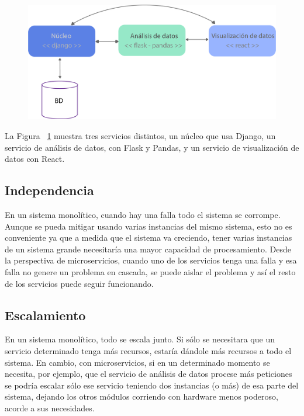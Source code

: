 \begin{figure}[h!]
  \centering
    \includegraphics{images/heterogeneidad-tecnologica.png}
  \label{fig:microht}
\end{figure}

\break

La Figura ~\ref{fig:microht} muestra tres servicios distintos, un núcleo que usa Django, un servicio de análisis de datos, con Flask y Pandas, y un servicio de visualización de datos con React.

\subsection[Independencia]{Independencia}

En un sistema monolítico, cuando hay una falla todo el sistema se corrompe. Aunque se pueda mitigar usando varias instancias del mismo sistema, esto no es conveniente ya que a medida que el sistema va creciendo, tener varias instancias de un sistema grande necesitaría una mayor capacidad de procesamiento.
Desde la perspectiva de microservicios, cuando uno de los servicios tenga una falla y esa falla no genere un problema en cascada, se puede aislar el problema y así el resto de los servicios puede seguir funcionando. 

\subsection[Escalamiento]{Escalamiento}

En un sistema monolítico, todo se escala junto. Si sólo se necesitara que un servicio determinado tenga más recursos, estaría dándole más recursos a todo el sistema.
En cambio, con microservicios, si en un determinado momento se necesita, por ejemplo, que el servicio de análisis de datos procese más peticiones se podría escalar sólo ese servicio teniendo dos instancias (o más) de esa parte del sistema, dejando los otros módulos corriendo con hardware menos poderoso, acorde a sus necesidades.

